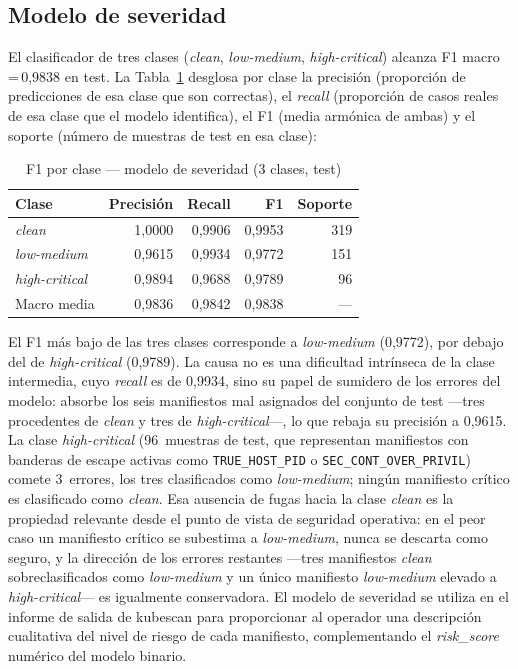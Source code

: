 \subsection{Modelo de severidad}

El clasificador de tres clases (\textit{clean}, \textit{low-medium},
\textit{high-critical}) alcanza F1 macro\,=\,0,9838 en test. La Tabla~\ref{tab:severity_f1}
desglosa por clase la precisión (proporción de predicciones de esa clase que son
correctas), el \textit{recall} (proporción de casos reales de esa clase que el
modelo identifica), el F1 (media armónica de ambas) y el soporte (número de
muestras de test en esa clase):

\begin{table}[htbp]
\centering
\caption{F1 por clase — modelo de severidad (3 clases, test)}
\label{tab:severity_f1}
\begin{tabular}{@{}lrrrr@{}}
\toprule
Clase & Precisión & Recall & F1 & Soporte \\
\midrule
\textit{clean}          & 1,0000 & 0,9906 & 0,9953 & 319 \\
\textit{low-medium}     & 0,9615 & 0,9934 & 0,9772 & 151 \\
\textit{high-critical}  & 0,9894 & 0,9688 & 0,9789 & 96 \\
\midrule
Macro media & 0,9836 & 0,9842 & 0,9838 & — \\
\bottomrule
\end{tabular}
\fuentepropia
\end{table}

El F1 más bajo de las tres clases corresponde a \textit{low-medium} (0,9772), por
debajo del de \textit{high-critical} (0,9789). La causa no es una dificultad
intrínseca de la clase intermedia, cuyo \textit{recall} es de 0,9934, sino su
papel de sumidero de los errores del modelo: absorbe los seis manifiestos mal
asignados del conjunto de test —tres procedentes de \textit{clean} y tres de
\textit{high-critical}\mbox{—,} lo que rebaja su precisión a 0,9615. La clase
\textit{high-critical} (96~muestras de test, que representan manifiestos con
banderas de escape activas como \texttt{TRUE\_HOST\_PID} o
\texttt{SEC\_CONT\_OVER\_PRIVIL}) comete 3~errores, los tres clasificados como
\textit{low-medium}; ningún manifiesto crítico es clasificado como
\textit{clean}. Esa ausencia de fugas hacia la clase \textit{clean} es la
propiedad relevante desde el punto de vista de seguridad operativa: en el peor
caso un manifiesto crítico se subestima a \textit{low-medium}, nunca se descarta
como seguro, y la dirección de los errores restantes —tres manifiestos
\textit{clean} sobreclasificados como \textit{low-medium} y un único manifiesto
\textit{low-medium} elevado a \textit{high-critical}— es igualmente conservadora.
El modelo de severidad se utiliza en el informe de salida
de kubescan para proporcionar al operador una descripción cualitativa
del nivel de riesgo de cada manifiesto, complementando el \textit{risk\_score}
numérico del modelo binario.

